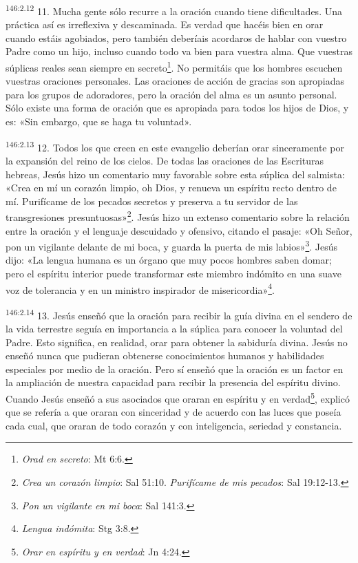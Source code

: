 \par 
\textsuperscript{146:2.12} 11. Mucha gente sólo recurre a la oración cuando tiene dificultades. Una práctica así es irreflexiva y descaminada. Es verdad que hacéis bien en orar cuando estáis agobiados, pero también deberíais acordaros de hablar con vuestro Padre como un hijo, incluso cuando todo va bien para vuestra alma. Que vuestras súplicas reales sean siempre en secreto\footnote{\textit{Orad en secreto}: Mt 6:6.}. No permitáis que los hombres escuchen vuestras oraciones personales. Las oraciones de acción de gracias son apropiadas para los grupos de adoradores, pero la oración del alma es un asunto personal. Sólo existe una forma de oración que es apropiada para todos los hijos de Dios, y es: «Sin embargo, que se haga tu voluntad».

\par 
\textsuperscript{146:2.13} 12. Todos los que creen en este evangelio deberían orar sinceramente por la expansión del reino de los cielos. De todas las oraciones de las Escrituras hebreas, Jesús hizo un comentario muy favorable sobre esta súplica del salmista: «Crea en mí un corazón limpio, oh Dios, y renueva un espíritu recto dentro de mí. Purifícame de los pecados secretos y preserva a tu servidor de las transgresiones presuntuosas»\footnote{\textit{Crea un corazón limpio}: Sal 51:10. \textit{Purifícame de mis pecados}: Sal 19:12-13.}. Jesús hizo un extenso comentario sobre la relación entre la oración y el lenguaje descuidado y ofensivo, citando el pasaje: «Oh Señor, pon un vigilante delante de mi boca, y guarda la puerta de mis labios»\footnote{\textit{Pon un vigilante en mi boca}: Sal 141:3.}. Jesús dijo: «La lengua humana es un órgano que muy pocos hombres saben domar; pero el espíritu interior puede transformar este miembro indómito en una suave voz de tolerancia y en un ministro inspirador de misericordia»\footnote{\textit{Lengua indómita}: Stg 3:8.}.

\par 
\textsuperscript{146:2.14} 13. Jesús enseñó que la oración para recibir la guía divina en el sendero de la vida terrestre seguía en importancia a la súplica para conocer la voluntad del Padre. Esto significa, en realidad, orar para obtener la sabiduría divina. Jesús no enseñó nunca que pudieran obtenerse conocimientos humanos y habilidades especiales por medio de la oración. Pero sí enseñó que la oración es un factor en la ampliación de nuestra capacidad para recibir la presencia del espíritu divino. Cuando Jesús enseñó a sus asociados que oraran en espíritu y en verdad\footnote{\textit{Orar en espíritu y en verdad}: Jn 4:24.}, explicó que se refería a que oraran con sinceridad y de acuerdo con las luces que poseía cada cual, que oraran de todo corazón y con inteligencia, seriedad y constancia.

